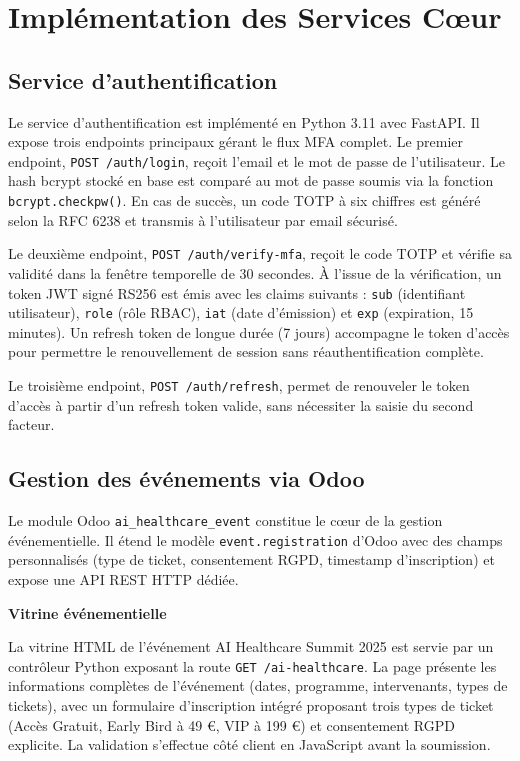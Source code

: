 \section{Implémentation des Services C\oe{}ur}

\subsection{Service d'authentification}
Le service d'authentification est implémenté en Python 3.11 avec FastAPI. Il expose trois endpoints principaux gérant le flux MFA complet. Le premier endpoint, \texttt{POST /auth/login}, reçoit l'email et le mot de passe de l'utilisateur. Le hash bcrypt stocké en base est comparé au mot de passe soumis via la fonction \texttt{bcrypt.checkpw()}. En cas de succès, un code TOTP à six chiffres est généré selon la RFC 6238 et transmis à l'utilisateur par email sécurisé.

Le deuxième endpoint, \texttt{POST /auth/verify-mfa}, reçoit le code TOTP et vérifie sa validité dans la fenêtre temporelle de 30 secondes. À l'issue de la vérification, un token JWT signé RS256 est émis avec les claims suivants : \texttt{sub} (identifiant utilisateur), \texttt{role} (rôle RBAC), \texttt{iat} (date d'émission) et \texttt{exp} (expiration, 15 minutes). Un refresh token de longue durée (7 jours) accompagne le token d'accès pour permettre le renouvellement de session sans réauthentification complète.

Le troisième endpoint, \texttt{POST /auth/refresh}, permet de renouveler le token d'accès à partir d'un refresh token valide, sans nécessiter la saisie du second facteur.

\subsection{Gestion des événements via Odoo}
Le module Odoo \texttt{ai\_healthcare\_event} constitue le c\oe{}ur de la gestion événementielle. Il étend le modèle \texttt{event.registration} d'Odoo avec des champs personnalisés (type de ticket, consentement RGPD, timestamp d'inscription) et expose une API REST HTTP dédiée.

\textbf{Vitrine événementielle}

La vitrine HTML de l'événement AI Healthcare Summit 2025 est servie par un contrôleur Python exposant la route \texttt{GET /ai-healthcare}. La page présente les informations complètes de l'événement (dates, programme, intervenants, types de tickets), avec un formulaire d'inscription intégré proposant trois types de ticket (Accès Gratuit, Early Bird à 49 €, VIP à 199 €) et consentement RGPD explicite. La validation s'effectue côté client en JavaScript avant la soumission.

